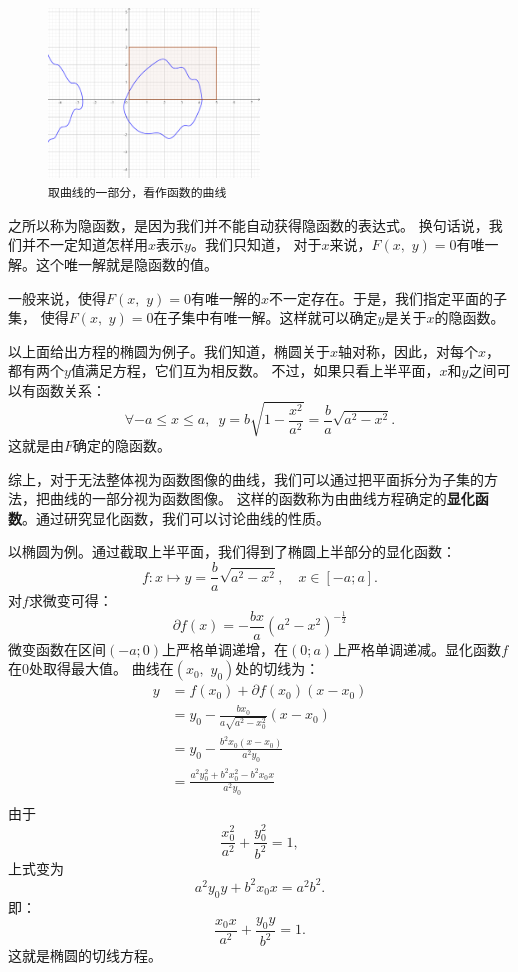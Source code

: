 \documentclass[12pt,UTF8]{ctexbook}
\theoremstyle{definition}
\theoremstyle{plain}
\begin{document}
\begin{figure} %
    \vspace{-30pt}
    \flushright
    \includegraphics[width=0.5\textwidth]{tu/复杂平面曲线.png}
    \caption*{\texttt{取曲线的一部分，看作函数的曲线}}
\end{figure}

之所以称为隐函数，是因为我们并不能自动获得隐函数的表达式。
换句话说，我们并不一定知道怎样用$x$表示$y$。我们只知道，
对于$x$来说，$F(x, \,\,y) = 0$有唯一解。这个唯一解就是隐函数的值。

一般来说，使得$F(x, \,\,y) = 0$有唯一解的$x$不一定存在。于是，我们指定平面的子集，
使得$F(x, \,\,y) = 0$在子集中有唯一解。这样就可以确定$y$是关于$x$的隐函数。

以上面给出方程的椭圆为例子。我们知道，椭圆关于$x$轴对称，因此，对每个$x$，都有两个$y$值满足方程，它们互为相反数。
不过，如果只看上半平面，$x$和$y$之间可以有函数关系：
$$ \forall -a\leqslant x \leqslant a, \,\,\, y = b\sqrt{1 - \frac{x^2}{a^2}}= \frac{b}{a}\sqrt{a^2 - x^2}. $$
这就是由$F$确定的隐函数。

综上，对于无法整体视为函数图像的曲线，我们可以通过把平面拆分为子集的方法，把曲线的一部分视为函数图像。
这样的函数称为由曲线方程确定的\textbf{显化函数}。通过研究显化函数，我们可以讨论曲线的性质。

以椭圆为例。通过截取上半平面，我们得到了椭圆上半部分的显化函数：
$$ f: x\mapsto y = \frac{b}{a}\sqrt{a^2 - x^2}, \quad x \in [-a; a].  $$
对$f$求微变可得：
$$ \partial f(x) = -\frac{bx}{a}(a^2 - x^2)^{-\frac{1}{2}}$$
微变函数在区间$(-a;0)$上严格单调递增，在$(0;a)$上严格单调递减。显化函数$f$在$0$处取得最大值。
曲线在$(x_0,\,\, y_0)$处的切线为：
\begin{align*}
    y &= f(x_0) + \partial f(x_0)(x - x_0) \\
    &= y_0 -\frac{bx_0}{a\sqrt{a^2 - x_0^2}}(x - x_0) \\
    &= y_0 - \frac{b^2x_0(x - x_0)}{a^2y_0} \\
    &= \frac{a^2y_0^2 + b^2x_0^2 - b^2x_0x}{a^2y_0} \\
\end{align*}
由于
$$ \frac{x_0^2}{a^2} + \frac{y_0^2}{b^2} = 1,$$
上式变为
$$ a^2y_0y +  b^2x_0x = a^2b^2. $$
即：
$$ \frac{x_0x}{a^2} + \frac{y_0y}{b^2} = 1.$$
这就是椭圆的切线方程。
\end{document}
